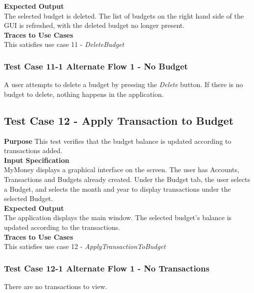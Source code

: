\documentclass[12pt]{article}
\begin{document}
\noindent
{\bf Expected Output}\\
The selected budget is deleted. The list of budgets on the right hand side of the GUI is refreshed, with the deleted budget no longer present.\\

\noindent
{\bf Traces to Use Cases}\\
This satisfies use case 11 - \textit{DeleteBudget}

\subsubsection
{Test Case 11-1 Alternate Flow 1 - No Budget}
A user attempts to delete a budget by pressing the \textit{Delete} button. If there is no budget to delete, nothing happens in the application.

\clearpage

\subsection{Test Case 12 - Apply Transaction to Budget} \label{TC-12}
\noindent
{\bf Purpose}
This test verifies that the budget balance is updated according to transactions added.\\
                                                    
\noindent
{\bf Input Specification}\\
MyMoney displays a graphical interface on the screen. The user has Accounts, Transactions and Budgets already created. Under the Budget tab, the user selects a Budget, and selects the month and year to display transactions under the selected Budget.\\

\noindent
{\bf Expected Output}\\
The application displays the main window. The selected budget's balance is updated according to the transactions.\\

\noindent
{\bf Traces to Use Cases}\\
This satisfies use case 12 - \textit{ApplyTransactionToBudget}\\

\subsubsection
{Test Case 12-1 Alternate Flow 1 - No Transactions}
There are no transactions to view.
\end{document}
